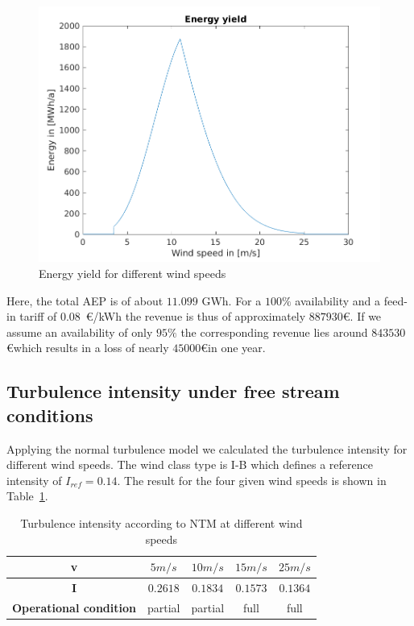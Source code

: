 \documentclass[10pt]{article}
\begin{document}
\begin{figure}[H]
\centering
\includegraphics[width=1\linewidth]{../CIP_5/CIP_Tutorial_5_-_Windfield_and_wake_simulation/energy_yield.png}
\caption{Energy yield for different wind speeds}
\label{fig:energyYield}
\end{figure} 

Here, the total AEP is of about $11.099$ GWh. For a $100\%$ availability and a feed-in tariff of $0.08$~\euro/kWh the revenue is thus of approximately $887930$\euro. If we assume an availability of only $95\%$ the corresponding revenue lies around $843530$\euro which results in a loss of nearly $45000$\euro in one year.

\subsection{Turbulence intensity under free stream conditions}
Applying the normal turbulence model we calculated the turbulence intensity for different wind speeds. The wind class type is I-B which defines a reference intensity of $I_{ref}=0.14$. The result for the four given wind speeds is shown in Table~\ref{tab:freestream}.

\begin{table}[H]
\centering
\begin{tabular}{| c | c | c | c | c |}
\hline
\textbf{v} & $5m/s$ & $10m/s$ & $15m/s$ & $25m/s$ \\
\hline
\textbf{I} & $0.2618$ & $0.1834$ & $0.1573$ & $0.1364$	\\
\hline
\textbf{Operational condition} & partial & partial & full & full	\\
\hline
\end{tabular}
\caption{Turbulence intensity according to NTM at different wind speeds}
\label{tab:freestream}
\end{table}
\end{document}
